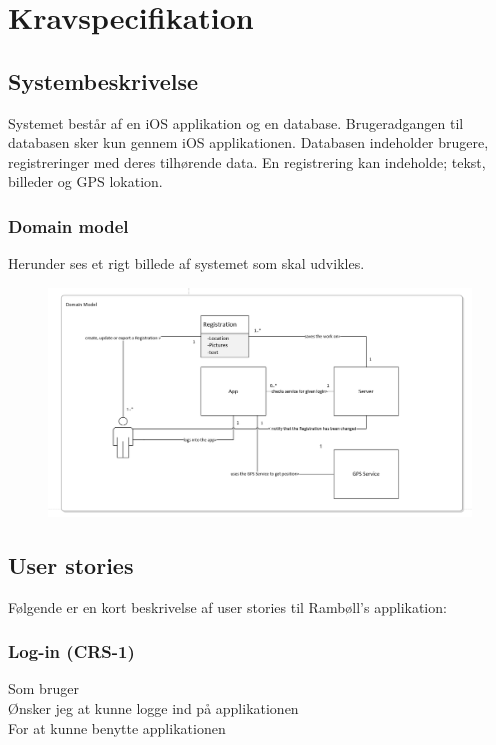 	\chapter{Kravspecifikation}
	
	\section{Systembeskrivelse}
	Systemet består af en iOS applikation og en database. Brugeradgangen til databasen sker kun gennem iOS applikationen.
	Databasen indeholder brugere, registreringer med deres tilhørende data.
	En registrering kan indeholde; tekst, billeder og GPS lokation.
	
	\subsection{Domain model}
	Herunder ses et rigt billede af systemet som skal udvikles.
	\begin{figure}[h!]
		\centering
		\includegraphics[width=1\linewidth]{Kravspecifikation/Domainmodel}
	\end{figure}	
	
	\section{User stories} 
	Følgende er en kort beskrivelse af user stories til Rambøll's applikation:

	\subsection*{Log-in (CRS-1)}
	Som bruger\\
	Ønsker jeg at kunne logge ind på applikationen\\
	For at kunne benytte applikationen
	
